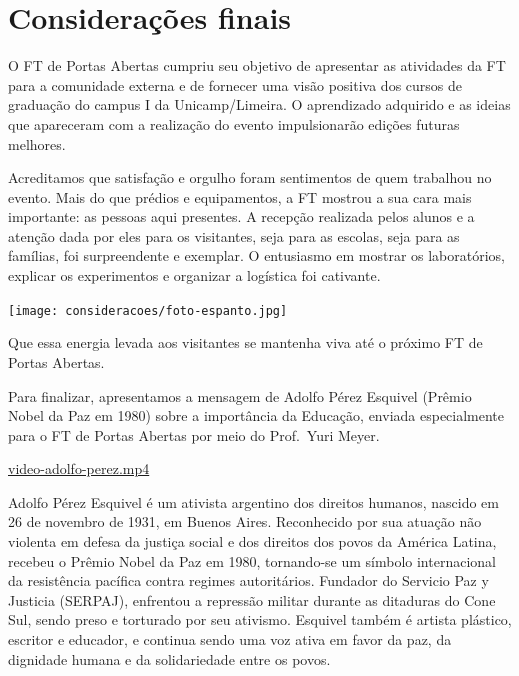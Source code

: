 \documentclass[
  letterpaper,
  DIV=11,
  numbers=noendperiod]{scrreprt}
\begin{document}

\chapter{Considerações finais}\label{considerauxe7uxf5es-finais}

O FT de Portas Abertas cumpriu seu objetivo de apresentar as atividades
da FT para a comunidade externa e de fornecer uma visão positiva dos
cursos de graduação do campus I da Unicamp/Limeira. O aprendizado
adquirido e as ideias que apareceram com a realização do evento
impulsionarão edições futuras melhores.

Acreditamos que satisfação e orgulho foram sentimentos de quem trabalhou
no evento. Mais do que prédios e equipamentos, a FT mostrou a sua cara
mais importante: as pessoas aqui presentes. A recepção realizada pelos
alunos e a atenção dada por eles para os visitantes, seja para as
escolas, seja para as famílias, foi surpreendente e exemplar. O
entusiasmo em mostrar os laboratórios, explicar os experimentos e
organizar a logística foi cativante.

\texttt{[image: consideracoes/foto-espanto.jpg]}

Que essa energia levada aos visitantes se mantenha viva até o próximo FT
de Portas Abertas.

Para finalizar, apresentamos a mensagem de Adolfo Pérez Esquivel (Prêmio
Nobel da Paz em 1980) sobre a importância da Educação, enviada
especialmente para o FT de Portas Abertas por meio do Prof.~Yuri Meyer.

\url{video-adolfo-perez.mp4}

\begin{tcolorbox}[enhanced jigsaw, opacityback=0, titlerule=0mm, breakable, colbacktitle=quarto-callout-caution-color!10!white, toptitle=1mm, colback=white, rightrule=.15mm, colframe=quarto-callout-caution-color-frame, leftrule=.75mm, coltitle=black, toprule=.15mm, arc=.35mm, opacitybacktitle=0.6, bottomtitle=1mm, left=2mm, bottomrule=.15mm, title=\textcolor{quarto-callout-caution-color}{\faFire}\hspace{0.5em}{Adolfo Pérez Esquivel}]

Adolfo Pérez Esquivel é um ativista argentino dos direitos humanos,
nascido em 26 de novembro de 1931, em Buenos Aires. Reconhecido por sua
atuação não violenta em defesa da justiça social e dos direitos dos
povos da América Latina, recebeu o Prêmio Nobel da Paz em 1980,
tornando-se um símbolo internacional da resistência pacífica contra
regimes autoritários. Fundador do Servicio Paz y Justicia (SERPAJ),
enfrentou a repressão militar durante as ditaduras do Cone Sul, sendo
preso e torturado por seu ativismo. Esquivel também é artista plástico,
escritor e educador, e continua sendo uma voz ativa em favor da paz, da
dignidade humana e da solidariedade entre os povos.

\end{tcolorbox}
\end{document}
